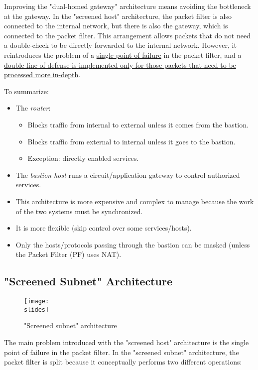 Improving the "dual-homed gateway" architecture means avoiding the bottleneck at the gateway. In the "screened host" architecture, the packet filter is also connected to the internal network, but there is also the gateway, which is connected to the packet filter. This arrangement allows packets that do not need a double-check to be directly forwarded to the internal network. However, it reintroduces the problem of a \underline{single point of failure} in the packet filter, and a \ul{double line of defense is implemented only for those packets that need to be processed more in-depth}.

To summarize:
\begin{itemize}
    \item The \textit{router}:
          \begin{itemize}
              \item Blocks traffic from internal to external unless it comes from the bastion.
              \item Blocks traffic from external to internal unless it goes to the bastion.
              \item Exception: directly enabled services.
          \end{itemize}
    \item The \textit{bastion host} runs a circuit/application gateway to control authorized services.
    \item This architecture is more expensive and complex to manage because the work of the two systems must be synchronized.
    \item It is more flexible (skip control over some services/hosts).
    \item Only the hosts/protocols passing through the bastion can be masked (unless the Packet Filter (PF) uses NAT).
\end{itemize}


\subsection{"Screened Subnet" Architecture}\label{chap:screened-subnet}

\begin{figure}[h]
    \centering
    \texttt{[image: \\slides]}
    \caption{"Screened subnet" architecture}
    \label{fig:screened-subnet}
\end{figure}

The main problem introduced with the "screened host" architecture is the single point of failure in the packet filter. In the "screened subnet" architecture, the packet filter is split because it conceptually performs two different operations:

